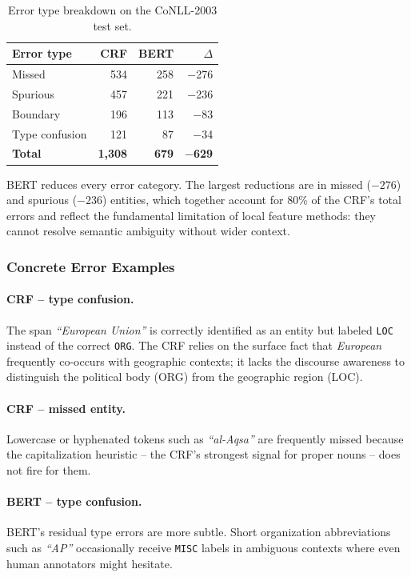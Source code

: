 \documentclass[11pt,a4paper]{article}
\begin{document}
\begin{table}[H]
\centering
\caption{Error type breakdown on the CoNLL-2003 test set.}
\label{tab:q2-errors}
\begin{tabular}{lrrr}
\toprule
\textbf{Error type} & \textbf{CRF} & \textbf{BERT} & \textbf{$\Delta$} \\
\midrule
Missed         & 534 & 258 & $-$276 \\
Spurious       & 457 & 221 & $-$236 \\
Boundary       & 196 & 113 & $-$83  \\
Type confusion & 121 &  87 & $-$34  \\
\midrule
\textbf{Total} & \textbf{1{,}308} & \textbf{679} & $-$\textbf{629} \\
\bottomrule
\end{tabular}
\end{table}

BERT reduces every error category. The largest reductions are in missed
($-276$) and spurious ($-236$) entities, which together account for 80\% of
the CRF's total errors and reflect the fundamental limitation of local feature
methods: they cannot resolve semantic ambiguity without wider context.

\subsubsection{Concrete Error Examples}

\paragraph{CRF -- type confusion.}
The span \emph{``European Union''} is correctly identified as an entity but
labeled \texttt{LOC} instead of the correct \texttt{ORG}. The CRF relies on
the surface fact that \emph{European} frequently co-occurs with geographic
contexts; it lacks the discourse awareness to distinguish the political body
(ORG) from the geographic region (LOC).

\paragraph{CRF -- missed entity.}
Lowercase or hyphenated tokens such as \emph{``al-Aqsa''} are frequently
missed because the capitalization heuristic -- the CRF's strongest signal for
proper nouns -- does not fire for them.

\paragraph{BERT -- type confusion.}
BERT's residual type errors are more subtle. Short organization abbreviations
such as \emph{``AP''} occasionally receive \texttt{MISC} labels in ambiguous
contexts where even human annotators might hesitate.
\end{document}
